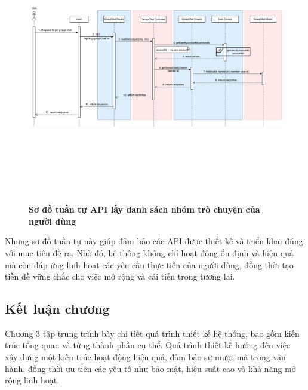 \begin{figure}[H]
	\centering
	\includegraphics[width=15cm,height=12cm]{Images/api_sequence/chat/getGroupChat.drawio.png}
	\caption[Sơ đồ tuần tự API lấy danh sách nhóm trò chuyện của người dùng]{\bfseries \fontsize{12pt}{0pt}\selectfont Sơ đồ tuần tự API lấy danh sách nhóm trò chuyện của người dùng}
	\label{sequence_diagram_get_group_chat}
\end{figure}

Những sơ đồ tuần tự này giúp đảm bảo các API được thiết kế và triển khai đúng với mục tiêu đề ra.
Nhờ đó, hệ thống không chỉ hoạt động ổn định và hiệu quả mà còn đáp ứng linh hoạt các yêu cầu thực tiễn của người dùng,
đồng thời tạo tiền đề vững chắc cho việc mở rộng và cải tiến trong tương lai.

\subsection{Kết luận chương}

Chương 3 tập trung trình bày chi tiết quá trình thiết kế hệ thống, bao gồm kiến trúc tổng quan và từng thành phần cụ thể.
Quá trình thiết kế hướng đến việc xây dựng một kiến trúc hoạt động hiệu quả, đảm bảo sự mượt mà trong vận hành,
đồng thời ưu tiên các yếu tố như bảo mật, hiệu suất cao và khả năng mở rộng linh hoạt.
\newpage